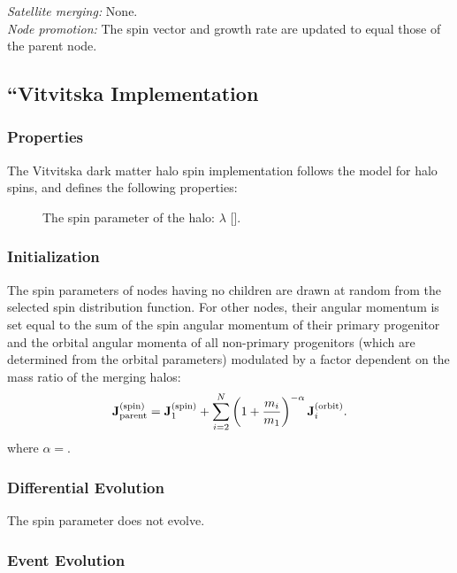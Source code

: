 \noindent\emph{Satellite merging:} None.\\

\noindent\emph{Node promotion:} The spin vector and growth rate are updated to equal those of the parent node.\\

\subsection{``Vitvitska Implementation}

\subsubsection{Properties}

The Vitvitska dark matter halo spin implementation follows the \cite{vitvitska_origin_2002} model for halo spins, and defines the following properties:
\begin{description}
 \item [] The spin parameter of the halo: $\lambda$ [].
\end{description}

\subsubsection{Initialization}

The spin parameters of nodes having no children are drawn at random from the selected spin distribution function. For other nodes, their angular momentum is set equal to the sum of the spin angular momentum of their primary progenitor and the orbital angular momenta of all non-primary progenitors (which are determined from the orbital parameters) modulated by a factor dependent on the mass ratio of the merging halos:
\begin{equation}
 \mathbf{J}^\mathrm{(spin)}_\mathrm{parent} = \mathbf{J}^\mathrm{(spin)}_{1} + \sum_{i=2}^N \left(1+{m_i \over m_{1}}\right)^{-\alpha} \mathbf{J}^\mathrm{(orbit)}_{i}.
\end{equation}
where $\alpha=$\mono{[spinVitvitskaMergerRatioExponent]}. 

\subsubsection{Differential Evolution}

The spin parameter does not evolve.

\subsubsection{Event Evolution}

